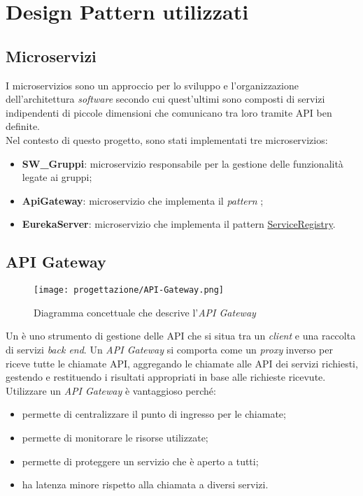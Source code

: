 \section{Design Pattern utilizzati}
\subsection{Microservizi}
I \glspl{microservizio} sono un approccio per lo sviluppo e l'organizzazione
dell'architettura \textit{software} secondo cui quest'ultimi sono composti di
servizi indipendenti di piccole dimensioni che comunicano tra loro tramite
\gls{API} ben definite.\\
Nel contesto di questo progetto, sono stati implementati tre
\glspl{microservizio}:
\begin{itemize}
    \item \textbf{SW\_Gruppi}: \gls{microservizio} responsabile per la gestione
          delle funzionalità legate ai gruppi;
    \item \textbf{ApiGateway}: \gls{microservizio} che implementa il
          \textit{pattern} ;
    \item \textbf{EurekaServer}: \gls{microservizio} che implementa il pattern
          \hyperref[sub:ServiceRegistry]{ServiceRegistry}.
          \cite{site-microservizi-aws}
\end{itemize}
\subsection{API Gateway}
\label{sub:ApiGateway}
\begin{figure}[H]
    \centering
    \texttt{[image: progettazione/API-Gateway.png]}
    \caption{Diagramma concettuale che descrive l'\textit{API Gateway}}
\end{figure}
Un  è uno strumento di gestione delle \gls{API} che si situa
tra un \textit{client} e una raccolta di servizi \textit{back end}. Un
\textit{API Gateway} si comporta come un \textit{proxy} inverso per riceve
tutte le chiamate \gls{API}, aggregando le chiamate alle \gls{API} dei servizi
richiesti, gestendo e restituendo i risultati appropriati in base alle
richieste ricevute.\\
Utilizzare un \textit{API Gateway} è vantaggioso perché:
\begin{itemize}
    \item permette di centralizzare il punto di ingresso per le chiamate;
    \item permette di monitorare le risorse utilizzate;
    \item permette di proteggere un servizio che è aperto a tutti;
    \item ha latenza minore rispetto alla chiamata a diversi servizi.
\end{itemize}

